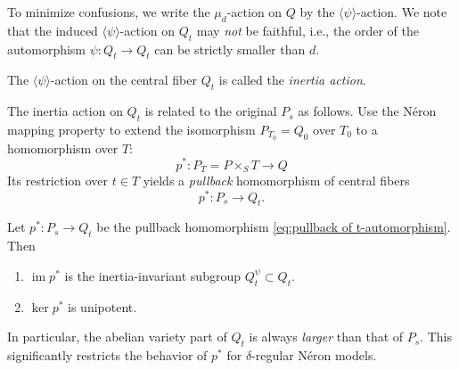 \documentclass[reqno, letterpaper]{amsart}
\numberwithin{equation}{subsection}
\let\to\longrightarrow
\DeclareMathOperator{\im}{im}
\begin{document}
			To minimize confusions, we write the $\mu_d$-action on $Q$ by the $\langle \psi \rangle$-action. We note that the induced $\langle \psi \rangle$-action on $Q_t$ may \emph{not} be faithful, i.e., the order of the automorphism $\psi : Q_t \to Q_t$ can be strictly smaller than $d$.
			
			\begin{definition}
				The $\langle \psi \rangle$-action on the central fiber $Q_t$ is called the \emph{inertia action}.
			\end{definition}
			
			The inertia action on $Q_t$ is related to the original $P_s$ as follows. Use the N\'eron mapping property to extend the isomorphism $P_{T_0} = Q_0$ over $T_0$ to a homomorphism over $T$:
			\[ p^* : P_T = P \times_S T \to Q \]
			Its restriction over $t \in T$ yields a \emph{pullback} homomorphism of central fibers
			\begin{equation} \label{eq:pullback of t-automorphism}
				p^* : P_s \to Q_t .
			\end{equation}
			
			\begin{theorem}  \label{thm:Edixhoven}
				Let $p^* : P_s \to Q_t$ be the pullback homomorphism \eqref{eq:pullback of t-automorphism}. Then
				\begin{enumerate}
					\item $\im p^*$ is the inertia-invariant subgroup $Q_t^\psi \subset Q_t$.
					\item $\ker p^*$ is unipotent.
				\end{enumerate}
			\end{theorem}
			
			In particular, the abelian variety part of $Q_t$ is always \emph{larger} than that of $P_s$. This significantly restricts the behavior of $p^*$ for $\delta$-regular N\'eron models.
			
\end{document}
